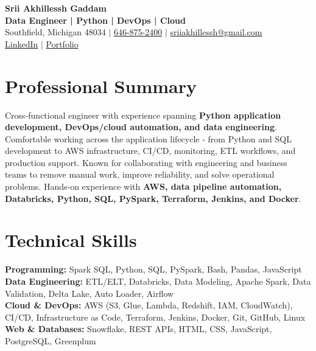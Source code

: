 \documentclass[letterpaper,10pt]{article}
\begin{document}
\fontsize{9.35pt}{10.45pt}\selectfont

\begin{center}
    {\LARGE \textbf{Srii Akhillessh Gaddam}} \\[-1pt]
    \textbf{Data Engineer | Python | DevOps | Cloud} \\[2pt]
    Southfield, Michigan 48034 $|$
    \href{tel:6468752400}{646-875-2400} $|$
    \href{mailto:sriiakhillessh@gmail.com}{sriiakhillessh@gmail.com} \\[1pt]
    \href{https://www.linkedin.com/in/srii-akhiilessh-gaddam-b48668191/}{LinkedIn} $|$
    \href{https://sriiakhillesshg.github.io/portfolio/}{Portfolio}
\end{center}
\vspace{-8pt}

\section{Professional Summary}
\small{Cross-functional engineer with experience spanning \textbf{Python application development, DevOps/cloud automation, and data engineering}. Comfortable working across the application lifecycle - from Python and SQL development to AWS infrastructure, CI/CD, monitoring, ETL workflows, and production support. Known for collaborating with engineering and business teams to remove manual work, improve reliability, and solve operational problems. Hands-on experience with \textbf{AWS, data pipeline automation, Databricks, Python, SQL, PySpark, Terraform, Jenkins, and Docker}.}

\section{Technical Skills}
\small{
\textbf{Programming:} Spark SQL, Python, SQL, PySpark, Bash, Pandas, JavaScript \\
\textbf{Data Engineering:} ETL/ELT, Databricks, Data Modeling, Apache Spark, Data Validation, Delta Lake, Auto Loader, Airflow \\
\textbf{Cloud \& DevOps:} AWS (S3, Glue, Lambda, Redshift, IAM, CloudWatch), CI/CD, Infrastructure as Code, Terraform, Jenkins, Docker, Git, GitHub, Linux \\
\textbf{Web \& Databases:} Snowflake, REST APIs, HTML, CSS, JavaScript, PostgreSQL, Greenplum
}
\end{document}
